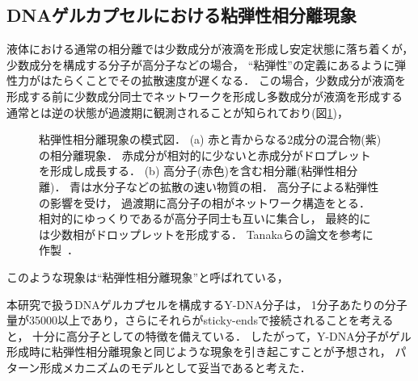 \subsection{DNAゲルカプセルにおける粘弾性相分離現象}
液体における通常の相分離では少数成分が液滴を形成し安定状態に落ち着くが，
少数成分を構成する分子が高分子などの場合，
``粘弾性''の定義にあるように弾性力がはたらくことでその拡散速度が遅くなる．
この場合，少数成分が液滴を形成する前に少数成分同士でネットワークを形成し多数成分が液滴を形成する
通常とは逆の状態が過渡期に観測されることが知られており(図\ref{fig:veps})，
\begin{figure}
    \centering
    
    \caption{
        粘弾性相分離現象の模式図．
        (a) 赤と青からなる2成分の混合物(紫)の相分離現象．
            赤成分が相対的に少ないと赤成分がドロプレットを形成し成長する．
        (b) 高分子(赤色)を含む相分離(粘弾性相分離)．
            青は水分子などの拡散の速い物質の相．
            高分子による粘弾性の影響を受け，
            過渡期に高分子の相がネットワーク構造をとる．
            相対的にゆっくりであるが高分子同士も互いに集合し，
            最終的には少数相がドロップレットを形成する．
        Tanakaらの論文を参考に作製~\cite{tanaka2009formation}．
    }
    \label{fig:veps}
\end{figure}
このような現象は``粘弾性相分離現象''と呼ばれている\cite{tanaka2009formation}，

本研究で扱うDNAゲルカプセルを構成するY-DNA分子は，
1分子あたりの分子量が35000以上であり，さらにそれらがsticky-endsで接続されることを考えると，
十分に高分子としての特徴を備えている．
したがって，Y-DNA分子がゲル形成時に粘弾性相分離現象と同じような現象を引き起こすことが予想され，
パターン形成メカニズムのモデルとして妥当であると考えた．
